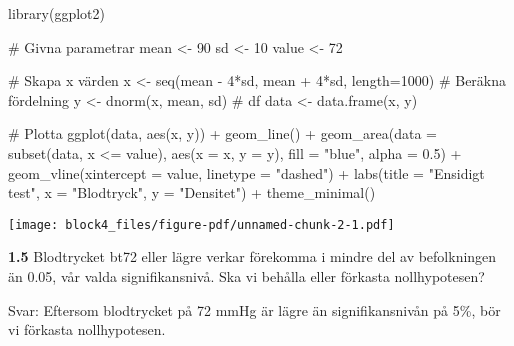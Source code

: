 \documentclass[
  letterpaper,
  DIV=11,
  numbers=noendperiod]{scrartcl}
\newenvironment{Shaded}{\begin{snugshade}}{\end{snugshade}}
\newcommand{\AttributeTok}[1]{\textcolor[rgb]{0.40,0.45,0.13}{#1}}
\newcommand{\CommentTok}[1]{\textcolor[rgb]{0.37,0.37,0.37}{#1}}
\newcommand{\DecValTok}[1]{\textcolor[rgb]{0.68,0.00,0.00}{#1}}
\newcommand{\FloatTok}[1]{\textcolor[rgb]{0.68,0.00,0.00}{#1}}
\newcommand{\FunctionTok}[1]{\textcolor[rgb]{0.28,0.35,0.67}{#1}}
\newcommand{\NormalTok}[1]{\textcolor[rgb]{0.00,0.23,0.31}{#1}}
\newcommand{\OtherTok}[1]{\textcolor[rgb]{0.00,0.23,0.31}{#1}}
\newcommand{\SpecialCharTok}[1]{\textcolor[rgb]{0.37,0.37,0.37}{#1}}
\newcommand{\StringTok}[1]{\textcolor[rgb]{0.13,0.47,0.30}{#1}}
\begin{document}
\begin{Shaded}
\begin{Highlighting}[]
\FunctionTok{library}\NormalTok{(ggplot2)}

\CommentTok{\# Givna parametrar}
\NormalTok{mean }\OtherTok{\textless{}{-}} \DecValTok{90}
\NormalTok{sd }\OtherTok{\textless{}{-}} \DecValTok{10}
\NormalTok{value }\OtherTok{\textless{}{-}} \DecValTok{72}

\CommentTok{\# Skapa x värden}
\NormalTok{x }\OtherTok{\textless{}{-}} \FunctionTok{seq}\NormalTok{(mean }\SpecialCharTok{{-}} \DecValTok{4}\SpecialCharTok{*}\NormalTok{sd, mean }\SpecialCharTok{+} \DecValTok{4}\SpecialCharTok{*}\NormalTok{sd, }\AttributeTok{length=}\DecValTok{1000}\NormalTok{)}
\CommentTok{\# Beräkna fördelning}
\NormalTok{y }\OtherTok{\textless{}{-}} \FunctionTok{dnorm}\NormalTok{(x, mean, sd)}
\CommentTok{\# df}
\NormalTok{data }\OtherTok{\textless{}{-}} \FunctionTok{data.frame}\NormalTok{(x, y)}

\CommentTok{\# Plotta}
\FunctionTok{ggplot}\NormalTok{(data, }\FunctionTok{aes}\NormalTok{(x, y)) }\SpecialCharTok{+}
  \FunctionTok{geom\_line}\NormalTok{() }\SpecialCharTok{+}
  \FunctionTok{geom\_area}\NormalTok{(}\AttributeTok{data =} \FunctionTok{subset}\NormalTok{(data, x }\SpecialCharTok{\textless{}=}\NormalTok{ value), }\FunctionTok{aes}\NormalTok{(}\AttributeTok{x =}\NormalTok{ x, }\AttributeTok{y =}\NormalTok{ y),}
  \AttributeTok{fill =} \StringTok{"blue"}\NormalTok{, }\AttributeTok{alpha =} \FloatTok{0.5}\NormalTok{) }\SpecialCharTok{+}
  \FunctionTok{geom\_vline}\NormalTok{(}\AttributeTok{xintercept =}\NormalTok{ value, }\AttributeTok{linetype =} \StringTok{"dashed"}\NormalTok{) }\SpecialCharTok{+}
  \FunctionTok{labs}\NormalTok{(}\AttributeTok{title =} \StringTok{"Ensidigt test"}\NormalTok{, }\AttributeTok{x =} \StringTok{"Blodtryck"}\NormalTok{, }\AttributeTok{y =} \StringTok{"Densitet"}\NormalTok{) }\SpecialCharTok{+}
  \FunctionTok{theme\_minimal}\NormalTok{()}
\end{Highlighting}
\end{Shaded}

\texttt{[image: block4\_files/figure-pdf/unnamed-chunk-2-1.pdf]}

\textbf{1.5} Blodtrycket bt72 eller lägre verkar förekomma i mindre del
av befolkningen än 0.05, vår valda signifikansnivå. Ska vi behålla eller
förkasta nollhypotesen?

\hfill\break
Svar: Eftersom blodtrycket på 72 mmHg är lägre än signifikansnivån på
5\%, bör vi förkasta nollhypotesen.\\
\end{document}
